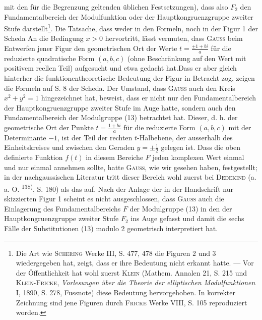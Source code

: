 mit den für die Begrenzung geltenden üblichen Festsetzungen), dass also
\(F_2\) den Fundamentalbereich der Modulfunktion oder der Hauptkongruenzgruppe
zweiter Stufe darstellt\footnote{Die Art wie \textsc{Schering} Werke III, S. 477, 478 die Figuren 2 und 3 wiedergegeben hat, zeigt, dass er ihre Bedeutung nicht erkannt hatte. — Vor der Öffentlichkeit hat wohl zuerst \textsc{Klein} (Mathem. Annalen 21, S. 215 und \textsc{Klein-Fricke}, \textit{Vorlesungen über die Theorie der elliptischen Modulfunktionen} I, 1890, S. 278, Fussnote) diese Bedeutung hervorgehoben. In korrekter Zeichnung sind jene Figuren durch \textsc{Fricke} Werke VIII, S. 105 reproduziert worden.}.
\clearpage{}
\noindent\hspace*{\parindent}Die Tatsache, dass weder in den Formeln, noch in der Figur 1 der Scheda
An die Bedingung \(x>0\) hervortritt, lässt vermuten, dass \textsc{Gauss} beim Entwerfen
jener Figur  den geometrischen Ort der
Werte \(t=\frac{\pm1+bi}a\) für die reduzierte quadratische Form \((a,b,c)\) (ohne Beschränkung
auf den Wert mit positivem reellen Teil) aufgesucht und  etwa
 gedacht hat.\linebreak Dass er aber gleich hinterher die
funktionentheoretische Bedeutung der Figur in Betracht zog, zeigen die Formeln
auf S. 8 der Scheda. Der Umstand, dass \textsc{Gauss} auch den Kreis
\(x^2+y^2=1\) hingezeichnet hat, beweist, dass er nicht nur den Fundamentalbereich
der Hauptkongruenzgruppe zweiter Stufe im Auge hatte, sondern auch
den Fundamentalbereich der Modulgruppe (13) betrachtet hat. Dieser, d. h.
der geometrische Ort der Punkte \(t=\frac{1+bi}a\) für die reduzierte Form \((a,b,c)\)
mit der Determinante \(-1\), ist der Teil der rechten \(t\)-Halbebene, der ausserhalb
des Einheitskreises und zwischen den Geraden \(y=\pm\frac12\) gelegen ist.
Dass die oben definierte Funktion \(f(t)\) in diesem Bereiche \(F\) jeden komplexen
Wert einmal und nur einmal annehmen sollte, hatte \textsc{Gauss}, wie
wir gesehen haben, festgestellt; in der nachgaussischen Literatur tritt dieser
Bereich wohl zuerst bei \textsc{Dedekind} (a. a. O. \textsuperscript{138)}, S. 180) als das 
auf. Nach der Anlage der in der Handschrift nur skizzierten Figur 1
scheint es nicht ausgeschlossen, dass \textsc{Gauss} auch die Einlagerung des Fundamentalbereichs
\(F\) der Modulgruppe (13) in den der Hauptkongruenzgruppe
zweiter Stufe \(F_2\) ins Auge gefasst und damit die sechs Fälle der Substitutionen
(13) modulo 2 geometrisch interpretiert hat.

